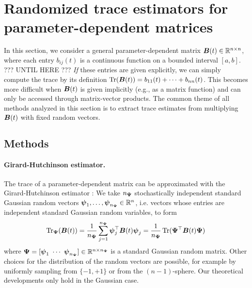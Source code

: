 \section{Randomized trace estimators for parameter-dependent matrices}
\label{sec:analysis}

\color{blue}
In this section, we consider a general parameter-dependent matrix
$\boldsymbol{B}(t) \in \mathbb{R}^{n \times n}$, where each
entry $b_{ij}(t)$ is a 
continuous function on a bounded interval $[a,b]$. ??? UNTIL HERE ??? \emph{If} these entries are given explicitly, we can simply compute the trace by its definition 
$\operatorname{Tr}(\boldsymbol{B}(t)) = b_{11}(t)+ \cdots + b_{nn}(t)$. This becomes more difficult when $\boldsymbol{B}(t)$ is given implicitly (e.g., as a matrix function) and can only be accessed through matrix-vector products. The common theme of all methods analyzed in this section is to extract trace estimates from multiplying $\boldsymbol{B}(t)$ with fixed random vectors.

\color{black}

\subsection{Methods}
\label{subsec:methods}

\paragraph{Girard-Hutchinson estimator.} The trace of a parameter-dependent matrix can be approximated with the Girard-Hutchinson estimator \cite{girard-1989-fast-montecarlo,hutchinson-1990-stochastic-estimator}: We take $n_{\boldsymbol{\Psi}}$ stochastically independent standard Gaussian random vectors $\boldsymbol{\psi}_1,\dots, \boldsymbol{\psi}_{n_{\boldsymbol{\Psi}}} \in \mathbb{R}^{n}$, i.e. vectors whose entries are independent standard Gaussian random variables, to form
\begin{equation}
    \operatorname{Tr}_{\boldsymbol{\Psi}}(\boldsymbol{B}(t))
    = \frac{1}{n_{\boldsymbol{\Psi}}} \sum_{j=1}^{n_{\boldsymbol{\Psi}}} \boldsymbol{\psi}_j^{\top} \boldsymbol{B}(t) \boldsymbol{\psi}_j
    = \frac{1}{n_{\boldsymbol{\Psi}}} \operatorname{Tr}( \boldsymbol{\Psi}^{\top} \boldsymbol{B}(t) \boldsymbol{\Psi})
    \label{equ:hutchinson-trace-estimator}
\end{equation}
where $\boldsymbol{\Psi} = [\boldsymbol{\psi}_1 ~ \cdots ~ \boldsymbol{\psi}_{n_{\boldsymbol{\Psi}}}] \in \mathbb{R}^{n \times n_{\boldsymbol{\Psi}}}$ is a standard Gaussian random matrix. Other choices for the distribution of the random vectors are possible, for example by uniformly sampling from $\{-1, +1\}$ or from the $(n-1)$-sphere. Our theoretical developments only hold in the Gaussian case.

